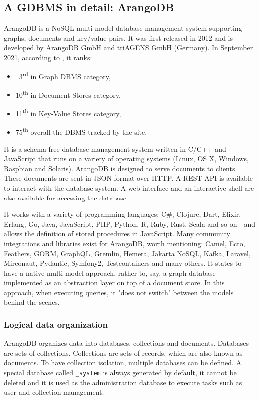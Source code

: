 \subsection{A GDBMS in detail: ArangoDB} \label{subsection:LiteratureReview/ReviewofGraphDatabaseSystems/AGDBMSindetailArangoDB}
ArangoDB is a NoSQL multi-model database management system supporting graphs, documents and key/value pairs.
It was first released in 2012 and is developed by ArangoDB GmbH and triAGENS GmbH (Germany).
In September 2021, according to , it ranks:
 \begin{itemize}[noitemsep]
	\item \ 3\textsuperscript{rd} in Graph DBMS category,
	\item 10\textsuperscript{th} in Document Stores category,
	\item 11\textsuperscript{th} in Key-Value Stores category,
	\item 75\textsuperscript{th} overall the DBMS tracked by the site.
\end{itemize}

It is a schema-free database management system written in C/C++ and JavaScript that runs on a variety of operating systems (Linux, OS X, Windows, Raspbian and Solaris).
ArangoDB is designed to serve documents to clients.
These documents are sent in JSON format over HTTP.
A REST \acrshort{API} is available to interact with the database system.
A web interface and an interactive shell are also available for accessing the database.

It works with a variety of programming languages: C\#, Clojure, Dart, Elixir, Erlang, Go, Java, JavaScript, PHP, \gls{Python}, R, Ruby, Rust, Scala and so on - and allows the definition of stored procedures in JavaScript.
Many community integrations and libraries exist for ArangoDB, worth mentioning: Camel, Ecto, Feathers, GORM, \gls{GraphQL}, Gremlin, Hemera, Jakarta NoSQL, Kafka, Laravel, Mirconaut, Pydantic, Symfony2, Testcontainers and many others.
It states to have a native multi-model approach, rather to, say, a graph database implemented as an abstraction layer on top of a document store.
In this approach, when executing queries, it "does not switch" between the models behind the scenes.

\subsubsection{Logical data organization}\label{subsubsection:LiteratureReview/ReviewofGraphDatabaseSystems/AGDBMSindetailArangoDB/Logicaldataorganization}
ArangoDB organizes data into databases, collections and documents.
Databases are sets of collections.
Collections are sets of records, which are also known as documents.
To have collection isolation, multiple databases can be defined.
A special database called \texttt{\_system} is always generated by default, it cannot be deleted and it is used as the administration database to execute tasks such as user and collection management.


